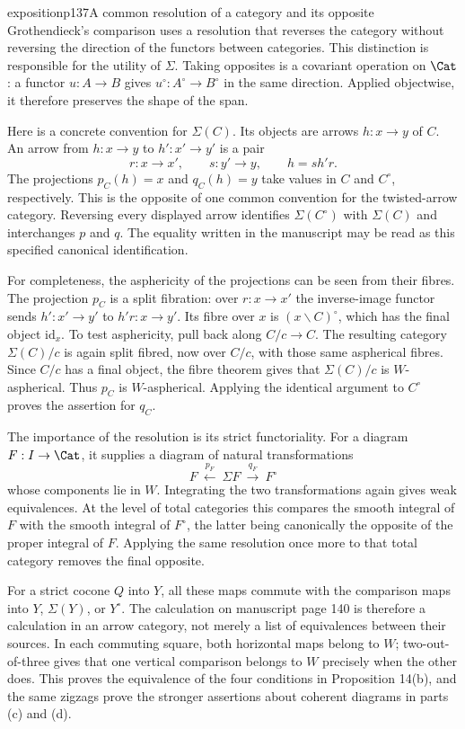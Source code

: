 \begin{dcomment}{exposition}{p137}{A common resolution of a category and its opposite}
Grothendieck's comparison uses a resolution that reverses the category without reversing the direction of the functors between categories. This distinction is responsible for the utility of $\Sigma$. Taking opposites is a covariant operation on $\Cat$: a functor $u:A\to B$ gives $u^\circ:A^\circ\to B^\circ$ in the same direction. Applied objectwise, it therefore preserves the shape of the span.

Here is a concrete convention for $\Sigma(C)$. Its objects are arrows $h:x\to y$ of $C$. An arrow from $h:x\to y$ to $h':x'\to y'$ is a pair
\[
 r:x\to x',\qquad s:y'\to y,
 \qquad h=s h'r.
\]
The projections $p_C(h)=x$ and $q_C(h)=y$ take values in $C$ and $C^\circ$, respectively. This is the opposite of one common convention for the twisted-arrow category. Reversing every displayed arrow identifies $\Sigma(C^\circ)$ with $\Sigma(C)$ and interchanges $p$ and $q$. The equality written in the manuscript may be read as this specified canonical identification.

For completeness, the asphericity of the projections can be seen from their fibres. The projection $p_C$ is a split fibration: over $r:x\to x'$ the inverse-image functor sends $h':x'\to y'$ to $h'r:x\to y'$. Its fibre over $x$ is $(x\backslash C)^\circ$, which has the final object $\mathrm{id}_x$. To test asphericity, pull back along $C/c\to C$. The resulting category $\Sigma(C)/c$ is again split fibred, now over $C/c$, with those same aspherical fibres. Since $C/c$ has a final object, the fibre theorem gives that $\Sigma(C)/c$ is $W$-aspherical. Thus $p_C$ is $W$-aspherical. Applying the identical argument to $C^\circ$ proves the assertion for $q_C$.

The importance of the resolution is its strict functoriality. For a diagram $F:I\to\Cat$, it supplies a diagram of natural transformations
\[
 F\ \xleftarrow{p_F}\ \Sigma F\ \xrightarrow{q_F}\ F^\circ
\]
whose components lie in $W$. Integrating the two transformations again gives weak equivalences. At the level of total categories this compares the smooth integral of $F$ with the smooth integral of $F^\circ$, the latter being canonically the opposite of the proper integral of $F$. Applying the same resolution once more to that total category removes the final opposite.

For a strict cocone $Q$ into $Y$, all these maps commute with the comparison maps into $Y$, $\Sigma(Y)$, or $Y^\circ$. The calculation on manuscript page 140 is therefore a calculation in an arrow category, not merely a list of equivalences between their sources. In each commuting square, both horizontal maps belong to $W$; two-out-of-three gives that one vertical comparison belongs to $W$ precisely when the other does. This proves the equivalence of the four conditions in Proposition 14(b), and the same zigzags prove the stronger assertions about coherent diagrams in parts (c) and (d).


\end{dcomment}
